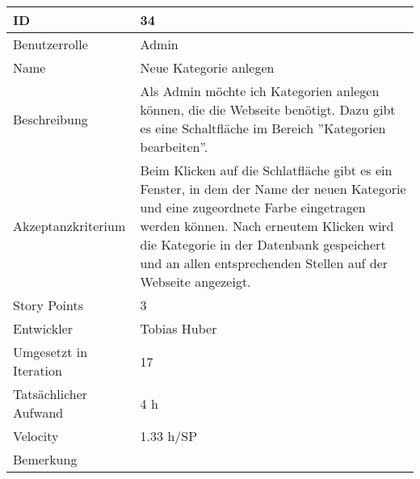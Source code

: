 \begin{tabularx}{\textwidth}{|p{}|X|}
	\hline
	ID & 34\\
	\hline
	Benutzerrolle & Admin\\
	\hline
	Name & Neue Kategorie anlegen\\
	\hline
	Beschreibung & Als Admin möchte ich Kategorien anlegen können, die die Webseite benötigt. Dazu gibt es eine Schaltfläche im Bereich ''Kategorien bearbeiten''.\\
	\hline
	Akzeptanzkriterium & Beim Klicken auf die Schlatfläche gibt es ein Fenster, in dem der Name der neuen Kategorie und eine zugeordnete Farbe eingetragen werden können. Nach erneutem Klicken wird die Kategorie in der Datenbank gespeichert und an allen entsprechenden Stellen auf der Webseite angezeigt.\\
	\hline
	Story Points & 3 \\
	\hline
	Entwickler & Tobias Huber\\
	\hline
	Umgesetzt in Iteration & 17\\
	\hline
	Tatsächlicher Aufwand & 4 h\\
	\hline
	Velocity & 1.33 h/SP\\
	\hline
	Bemerkung & \\
	\hline
\end{tabularx}
\vspace{20pt}
